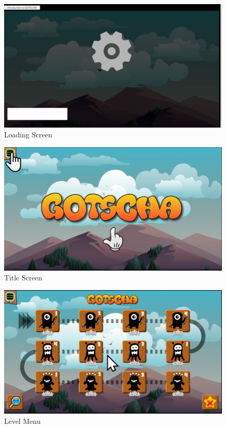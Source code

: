 \begin{figure}[H]
    \centering
    \includegraphics[width=1\textwidth]{figures/loadingscreen}
    \caption{Loading Screen}
    \label{fig:loadingscreen}
\end{figure}

\begin{figure}[H]
    \centering
    \includegraphics[width=1\textwidth]{figures/welcomescreen}
    \caption{Title Screen}
    \label{fig:titlescreen}
\end{figure}

\begin{figure}[H]
    \centering
    \includegraphics[width=1\textwidth]{figures/levelmenu}
    \caption{Level Menu}
    \label{fig:levelmenu}
\end{figure}


